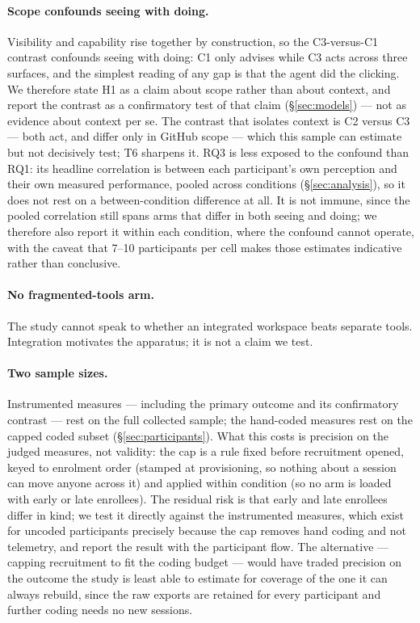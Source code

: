 \documentclass[acmsmall,review,screen]{acmart}
\begin{document}
\paragraph{Scope confounds seeing with doing.} Visibility and capability rise
together by construction, so the C3-versus-C1 contrast confounds seeing with
doing: C1 only advises while C3 acts across three surfaces, and the simplest
reading of any gap is that the agent did the clicking. We therefore state H1 as a
claim about scope rather than about context, and report the contrast as a
confirmatory test of that claim (\S\ref{sec:models}) --- not as evidence about
context per se. The
contrast that isolates context is C2 versus C3 --- both act, and differ only in
GitHub scope --- which this sample can estimate but not decisively test; T6
sharpens it. RQ3 is less exposed to the confound than RQ1: its headline
correlation is between each participant's own perception and their own measured
performance, pooled across conditions (\S\ref{sec:analysis}), so it does not
rest on a between-condition difference at all. It is not immune, since the
pooled correlation still spans arms that differ in both seeing and doing; we
therefore also report it within each condition, where the confound cannot
operate, with the caveat that 7--10 participants per cell makes those estimates
indicative rather than conclusive.

\paragraph{No fragmented-tools arm.} The study cannot speak to whether an
integrated workspace beats separate tools. Integration motivates the apparatus;
it is not a claim we test.

\paragraph{Two sample sizes.} Instrumented measures --- including the primary
outcome and its confirmatory contrast --- rest on the full collected sample;
the hand-coded measures rest on the capped coded subset
(\S\ref{sec:participants}). What this costs is precision on the judged measures,
not validity: the cap is a rule fixed before recruitment opened, keyed to
enrolment order (stamped at provisioning, so nothing about a session can move
anyone across it) and applied within condition (so no arm is loaded with early or
late enrollees). The residual risk is that early and late enrollees differ in
kind; we test it directly against the instrumented measures, which exist for
uncoded participants precisely because the cap removes hand coding and not
telemetry, and report the result with the participant flow. The alternative ---
capping recruitment to fit the coding budget --- would have traded precision on
the outcome the study is least able to estimate for coverage of the one it can
always rebuild, since the raw exports are retained for every participant and
further coding needs no new sessions.
\end{document}

